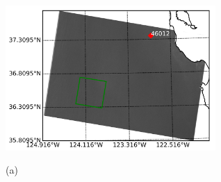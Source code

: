 \documentclass{article}
\begin{document}
\begin{figure}[tpb]
\setlength{\belowcaptionskip}{-0.6cm}
\centering
\begin{minipage}[b]{0.48\linewidth}
  \centering
  \centerline{\includegraphics[width=8cm]{1.png}}
  \centerline{(a)}\medskip
\end{minipage}


\end{figure}
\end{document}

